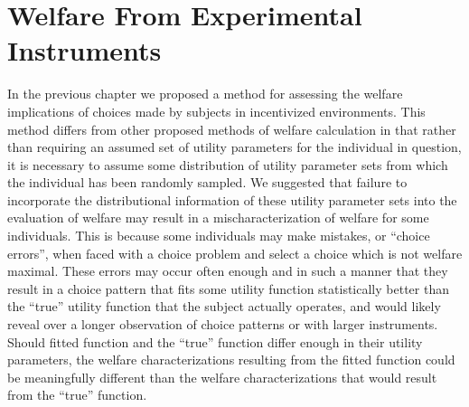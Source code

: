 \documentclass[../main.tex]{subfiles}
\begin{document}
\onehalfspacing
\setcounter{chapter}{3}

\chapter{Welfare From Experimental Instruments}

\lltoc %

In the previous chapter we proposed a method for assessing the welfare implications of choices made by subjects in incentivized environments.
This method differs from other proposed methods of welfare calculation in that rather than requiring an assumed set of utility parameters for the individual in question, it is necessary to assume some distribution of utility parameter sets from which the individual has been randomly sampled.
We suggested that failure to incorporate the distributional information of these utility parameter sets into the evaluation of welfare may result in a mischaracterization of welfare for some individuals.
This is because some individuals may make mistakes, or \enquote{choice errors}, when faced with a choice problem and select a choice which is not welfare maximal.
These errors may occur often enough and in such a manner that they result in a choice pattern that fits some utility function statistically better than the \enquote{true} utility function that the subject actually operates, and would likely reveal over a longer observation of choice patterns or with larger instruments.
Should fitted function and the \enquote{true} function differ enough in their utility parameters, the welfare characterizations resulting from the fitted function could be meaningfully different than the welfare characterizations that would result from the \enquote{true} function.{\footnotemark}

\addtocounter{footnote}{-1}
\end{document}
